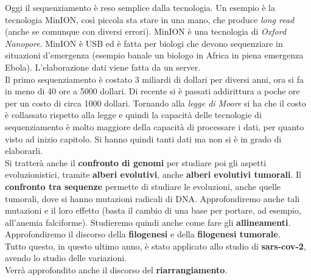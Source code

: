 \documentclass[a4paper,12pt, oneside]{book}
\begin{document}
Oggi il sequenziamento è reso semplice dalla tecnologia. Un esempio è la
tecnologia MinION, così piccola sta stare in una mano, che produce \textit{long
  read} (anche se comunque con diversi errori). MinION è una tecnologia di
\textit{Oxford Nanopore}. MinION è USB ed è fatta per
biologi che devono sequenziare in situazioni d'emergenza (esempio banale un
biologo in Africa in piena emergenza Ebola). L'elaborazione dati viene fatta da
un server.\\
Il primo sequenziamento è costato 3 miliardi di dollari per diversi anni, ora si
fa in meno di 40 ore a 5000 dollari. Di recente si è passati addirittura a poche
ore per un costo di circa 1000 dollari. Tornando alla \textit{legge di Moore} si
ha che il costo è collassato rispetto alla legge e quindi la capacità delle
tecnologie di sequenziamento è molto maggiore della capacità di processare i
dati, per quanto visto ad inizio capitolo. Si hanno quindi tanti dati ma non si
è in grado di elaborarli.\\
Si tratterà anche il \textbf{confronto di genomi} per studiare poi gli aspetti
evoluzionistici, tramite \textbf{alberi evolutivi}, anche \textbf{alberi
  evolutivi tumorali}. Il \textbf{confronto tra sequenze} 
permette di studiare le evoluzioni, anche quelle tumorali, dove si hanno
mutazioni radicali di DNA. Approfondiremo anche tali mutazioni e il loro effetto
(basta il cambio di una base per portare, ad esempio, all'anemia
falciforme). Studieremo quindi anche come fare gli\textbf{
  allineamenti}. Approfondiremo il discorso della \textbf{filogenesi} e della
\textbf{filogenesi tumorale}.\\
Tutto questo, in questo ultimo anno, è stato applicato allo studio di
\textbf{sars-cov-2}, avendo lo studio delle variazioni. \\
Verrà approfondito anche il discorso del \textbf{riarrangiamento}.
\end{document}
